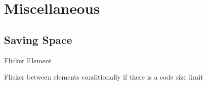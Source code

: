 \documentclass[article,12pt,oneside]{memoir}
\begin{document}
\pagebreak
\chapter{Miscellaneous}

\section{Saving Space}


Flicker Element

Flicker between elements conditionally if there is a code size limit
\end{document}
